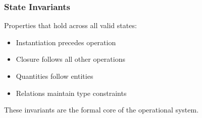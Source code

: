 \subsubsection{State Invariants}
Properties that hold across all valid states:
\begin{itemize}
    \item Instantiation precedes operation
    \item Closure follows all other operations
    \item Quantities follow entities
    \item Relations maintain type constraints
\end{itemize}

These invariants are the formal core of the operational system.
